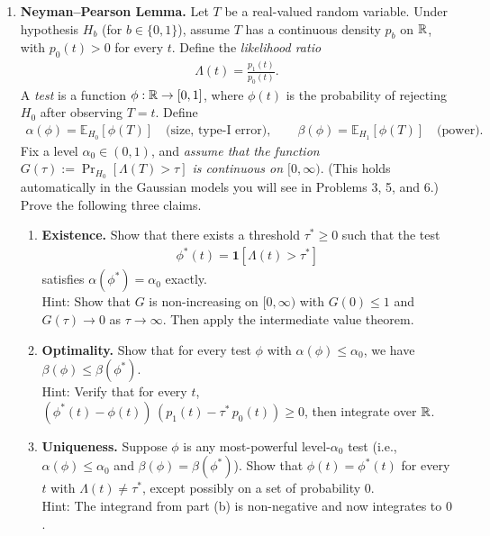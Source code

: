 \documentclass[12pt]{article}
\renewcommand{\fE}{\mathbb{E}}
\begin{document}
\begin{enumerate}

\item \textbf{Neyman--Pearson Lemma.}
Let $T$ be a real-valued random variable. Under hypothesis $H_b$ (for $b \in \{0, 1\}$), assume $T$ has a continuous density $p_b$ on $\mathbb{R}$, with $p_0(t) > 0$ for every $t$. Define the \emph{likelihood ratio}
\begin{align*}
    \Lambda(t) = \frac{p_1(t)}{p_0(t)}.
\end{align*}
A \emph{test} is a function $\phi : \mathbb{R} \to [0, 1]$, where $\phi(t)$ is the probability of rejecting $H_0$ after observing $T = t$. Define
\begin{align*}
    \alpha(\phi) = \fE_{H_0}[\phi(T)] \quad \text{(size, type-I error)}, \qquad \beta(\phi) = \fE_{H_1}[\phi(T)] \quad \text{(power)}.
\end{align*}
Fix a level $\alpha_0 \in (0, 1)$, and \emph{assume that the function $G(\tau) := \Pr_{H_0}[\Lambda(T) > \tau]$ is continuous on $[0, \infty)$}. (This holds automatically in the Gaussian models you will see in Problems 3, 5, and 6.) Prove the following three claims.
\begin{enumerate}
    \item \textbf{Existence.} Show that there exists a threshold $\tau^* \ge 0$ such that the test
    \begin{align*}
        \phi^*(t) = \mathbf{1}[\Lambda(t) > \tau^*]
    \end{align*}
    satisfies $\alpha(\phi^*) = \alpha_0$ exactly.\\
    Hint: Show that $G$ is non-increasing on $[0, \infty)$ with $G(0) \le 1$ and $G(\tau) \to 0$ as $\tau \to \infty$. Then apply the intermediate value theorem.

    \item \textbf{Optimality.} Show that for every test $\phi$ with $\alpha(\phi) \le \alpha_0$, we have $\beta(\phi) \le \beta(\phi^*)$.\\
    Hint: Verify that for every $t$, $(\phi^*(t) - \phi(t))\,(p_1(t) - \tau^*\, p_0(t)) \ge 0$, then integrate over $\mathbb{R}$.

    \item \textbf{Uniqueness.} Suppose $\phi$ is any most-powerful level-$\alpha_0$ test (i.e., $\alpha(\phi) \le \alpha_0$ and $\beta(\phi) = \beta(\phi^*)$). Show that $\phi(t) = \phi^*(t)$ for every $t$ with $\Lambda(t) \ne \tau^*$, except possibly on a set of probability $0$.\\
    Hint: The integrand from part (b) is non-negative and now integrates to $0$.
\end{enumerate}


\end{enumerate}
\end{document}
